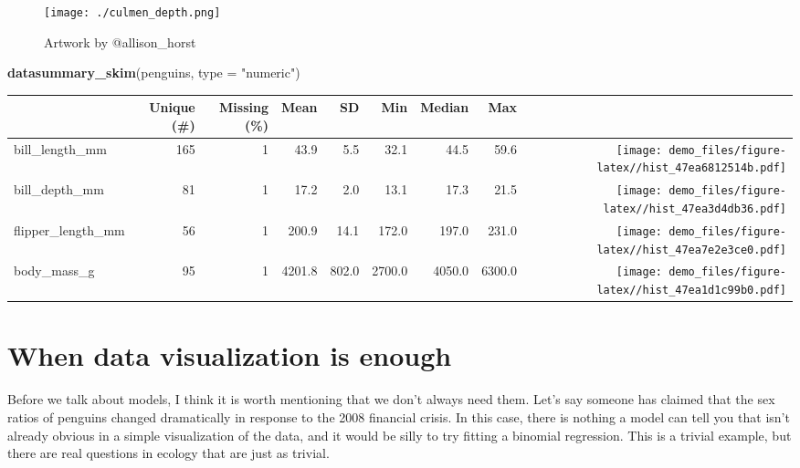 \documentclass[
]{article}
\newenvironment{Shaded}{\begin{snugshade}}{\end{snugshade}}
\newcommand{\AttributeTok}[1]{\textcolor[rgb]{0.13,0.29,0.53}{#1}}
\newcommand{\FunctionTok}[1]{\textcolor[rgb]{0.13,0.29,0.53}{\textbf{#1}}}
\newcommand{\NormalTok}[1]{#1}
\newcommand{\StringTok}[1]{\textcolor[rgb]{0.31,0.60,0.02}{#1}}
\begin{document}
\begin{figure}
\centering
\texttt{[image: ./culmen\_depth.png]}
\caption{Artwork by @allison\_horst}
\end{figure}

\begin{Shaded}
\begin{Highlighting}[]
\FunctionTok{datasummary\_skim}\NormalTok{(penguins, }\AttributeTok{type =} \StringTok{"numeric"}\NormalTok{)}
\end{Highlighting}
\end{Shaded}

\begin{table}
\centering
\begin{tabular}[t]{lrrrrrrr>{}r}
\toprule
  & Unique (\#) & Missing (\%) & Mean & SD & Min & Median & Max &   \\
\midrule
bill\_length\_mm & 165 & 1 & \num{43.9} & \num{5.5} & \num{32.1} & \num{44.5} & \num{59.6} & \texttt{[image: demo\_files/figure-latex//hist\_47ea6812514b.pdf]}\\
bill\_depth\_mm & 81 & 1 & \num{17.2} & \num{2.0} & \num{13.1} & \num{17.3} & \num{21.5} & \texttt{[image: demo\_files/figure-latex//hist\_47ea3d4db36.pdf]}\\
flipper\_length\_mm & 56 & 1 & \num{200.9} & \num{14.1} & \num{172.0} & \num{197.0} & \num{231.0} & \texttt{[image: demo\_files/figure-latex//hist\_47ea7e2e3ce0.pdf]}\\
body\_mass\_g & 95 & 1 & \num{4201.8} & \num{802.0} & \num{2700.0} & \num{4050.0} & \num{6300.0} & \texttt{[image: demo\_files/figure-latex//hist\_47ea1d1c99b0.pdf]}\\
\bottomrule
\end{tabular}
\end{table}

\hypertarget{when-data-visualization-is-enough}{%
\section{When data visualization is
enough}\label{when-data-visualization-is-enough}}

Before we talk about models, I think it is worth mentioning that we
don't always need them. Let's say someone has claimed that the sex
ratios of penguins changed dramatically in response to the 2008
financial crisis. In this case, there is nothing a model can tell you
that isn't already obvious in a simple visualization of the data, and it
would be silly to try fitting a binomial regression. This is a trivial
example, but there are real questions in ecology that are just as
trivial.
\end{document}
